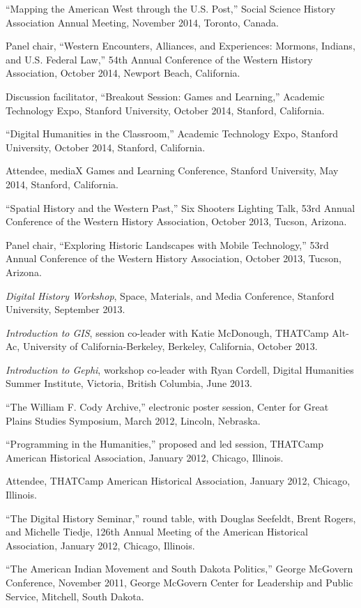 ``Mapping the American West through the U.S. Post,'' Social Science
History Association Annual Meeting, November 2014, Toronto, Canada.

Panel chair, ``Western Encounters, Alliances, and Experiences: Mormons,
Indians, and U.S. Federal Law,'' 54th Annual Conference of the Western
History Association, October 2014, Newport Beach, California.

Discussion facilitator, ``Breakout Session: Games and Learning,''
Academic Technology Expo, Stanford University, October 2014, Stanford,
California.

``Digital Humanities in the Classroom,'' Academic Technology Expo,
Stanford University, October 2014, Stanford, California.

Attendee, mediaX Games and Learning Conference, Stanford University, May
2014, Stanford, California.

``Spatial History and the Western Past,'' Six Shooters Lighting Talk,
53rd Annual Conference of the Western History Association, October 2013,
Tucson, Arizona.

Panel chair, ``Exploring Historic Landscapes with Mobile Technology,''
53rd Annual Conference of the Western History Association, October 2013,
Tucson, Arizona.

\emph{Digital History Workshop}, Space, Materials, and Media Conference,
Stanford University, September 2013.

\emph{Introduction to GIS}, session co-leader with Katie McDonough,
THATCamp Alt-Ac, University of California-Berkeley, Berkeley,
California, October 2013.

\emph{Introduction to Gephi}, workshop co-leader with Ryan Cordell,
Digital Humanities Summer Institute, Victoria, British Columbia, June
2013.

``The William F. Cody Archive,'' electronic poster session, Center for
Great Plains Studies Symposium, March 2012, Lincoln, Nebraska.

``Programming in the Humanities,'' proposed and led session, THATCamp
American Historical Association, January 2012, Chicago, Illinois.

Attendee, THATCamp American Historical Association, January 2012,
Chicago, Illinois.

``The Digital History Seminar,'' round table, with Douglas Seefeldt,
Brent Rogers, and Michelle Tiedje, 126th Annual Meeting of the American
Historical Association, January 2012, Chicago, Illinois.

``The American Indian Movement and South Dakota Politics,'' George
McGovern Conference, November 2011, George McGovern Center for
Leadership and Public Service, Mitchell, South Dakota.

